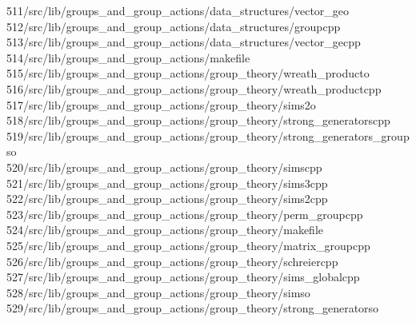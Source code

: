 \begin{tabbing}
511\>/src/lib/groups\_and\_group\_actions/data\_structures/vector\_geo\\[0pt]
512\>/src/lib/groups\_and\_group\_actions/data\_structures/groupcpp\\[0pt]
513\>/src/lib/groups\_and\_group\_actions/data\_structures/vector\_gecpp\\[0pt]
514\>/src/lib/groups\_and\_group\_actions/makefile\\[0pt]
515\>/src/lib/groups\_and\_group\_actions/group\_theory/wreath\_producto\\[0pt]
516\>/src/lib/groups\_and\_group\_actions/group\_theory/wreath\_productcpp\\[0pt]
517\>/src/lib/groups\_and\_group\_actions/group\_theory/sims2o\\[0pt]
518\>/src/lib/groups\_and\_group\_actions/group\_theory/strong\_generatorscpp\\[0pt]
519\>/src/lib/groups\_and\_group\_actions/group\_theory/strong\_generators\_groupso\\[0pt]
520\>/src/lib/groups\_and\_group\_actions/group\_theory/simscpp\\[0pt]
521\>/src/lib/groups\_and\_group\_actions/group\_theory/sims3cpp\\[0pt]
522\>/src/lib/groups\_and\_group\_actions/group\_theory/sims2cpp\\[0pt]
523\>/src/lib/groups\_and\_group\_actions/group\_theory/perm\_groupcpp\\[0pt]
524\>/src/lib/groups\_and\_group\_actions/group\_theory/makefile\\[0pt]
525\>/src/lib/groups\_and\_group\_actions/group\_theory/matrix\_groupcpp\\[0pt]
526\>/src/lib/groups\_and\_group\_actions/group\_theory/schreiercpp\\[0pt]
527\>/src/lib/groups\_and\_group\_actions/group\_theory/sims\_globalcpp\\[0pt]
528\>/src/lib/groups\_and\_group\_actions/group\_theory/simso\\[0pt]
529\>/src/lib/groups\_and\_group\_actions/group\_theory/strong\_generatorso\\[0pt]

\end{tabbing}
